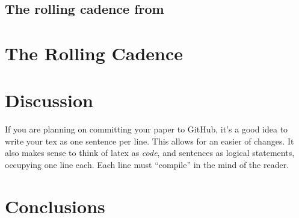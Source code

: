 \documentclass[\docopts]{\docclass}
\begin{document}

\subsection{The rolling cadence from }
\label{sec:results}


\section{The Rolling Cadence }
\label{sec:results}







\section{Discussion}
\label{sec:discussion}

If you are planning on committing your paper to GitHub, it's a good idea to write your tex as one sentence per line.
This allows for an easier  of changes.
It also makes sense to think of latex as \emph{code}, and sentences as logical statements, occupying one line each.
Each line must ``compile'' in the mind of the reader.



\section{Conclusions}
\label{sec:conclusions}
\end{document}
